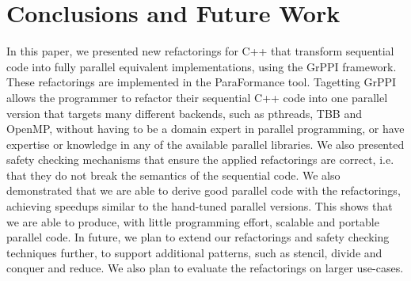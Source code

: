 \section{Conclusions and Future Work}
In this paper, we presented new refactorings for C++ that transform sequential code into fully parallel equivalent implementations, using the GrPPI framework. These refactorings are implemented in the ParaFormance tool. Tagetting GrPPI allows the programmer to refactor their sequential C++ code into one parallel version that targets many different backends, such as pthreads, TBB and OpenMP, without having to be a domain expert in parallel programming, or have expertise or knowledge in any of the available parallel libraries. We also presented safety checking mechanisms that ensure the applied refactorings are correct, i.e. that they do not break the semantics of the sequential code. We also demonstrated that we are able to derive good parallel code with the refactorings, achieving speedups similar to the hand-tuned parallel versions. This shows that we are able to produce, with little programming effort, scalable and portable parallel code.
%
In future, we plan to extend our refactorings and safety checking techniques further, to support additional patterns, such as stencil, divide and conquer and reduce. We also plan to evaluate the refactorings on larger use-cases.









